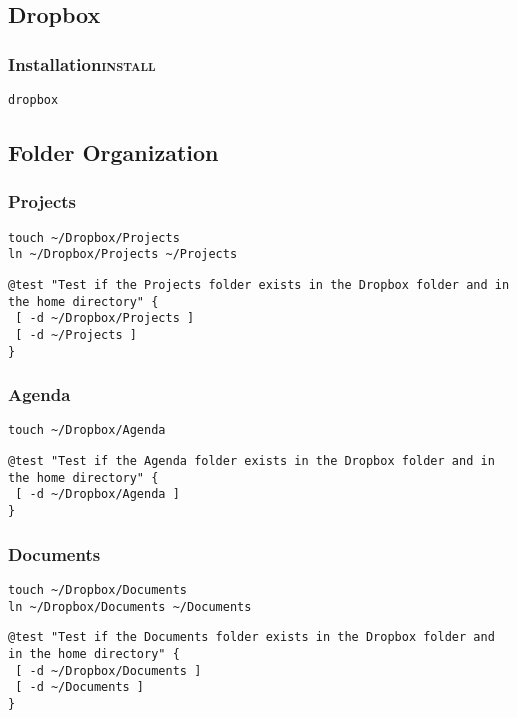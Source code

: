 \documentclass[11pt]{article}
\begin{document}
\subsection{Dropbox}
\label{sec:org0356fed}
\subsubsection{Installation\hfill{}\textsc{install}}
\label{sec:org364b5c2}
\begin{verbatim}
dropbox
\end{verbatim}
\subsection{Folder Organization}
\label{sec:org845596e}
\subsubsection{Projects}
\label{sec:org1fc13ff}
\begin{verbatim}
touch ~/Dropbox/Projects
ln ~/Dropbox/Projects ~/Projects
\end{verbatim}

\begin{verbatim}
@test "Test if the Projects folder exists in the Dropbox folder and in the home directory" {
 [ -d ~/Dropbox/Projects ]
 [ -d ~/Projects ]
}
\end{verbatim}
\subsubsection{Agenda}
\label{sec:orgfb8fcd1}
\begin{verbatim}
touch ~/Dropbox/Agenda
\end{verbatim}

\begin{verbatim}
@test "Test if the Agenda folder exists in the Dropbox folder and in the home directory" {
 [ -d ~/Dropbox/Agenda ]
}
\end{verbatim}

\subsubsection{Documents}
\label{sec:orgf9e522c}
\begin{verbatim}
touch ~/Dropbox/Documents
ln ~/Dropbox/Documents ~/Documents
\end{verbatim}

\begin{verbatim}
@test "Test if the Documents folder exists in the Dropbox folder and in the home directory" {
 [ -d ~/Dropbox/Documents ]
 [ -d ~/Documents ]
}
\end{verbatim}
\end{document}
